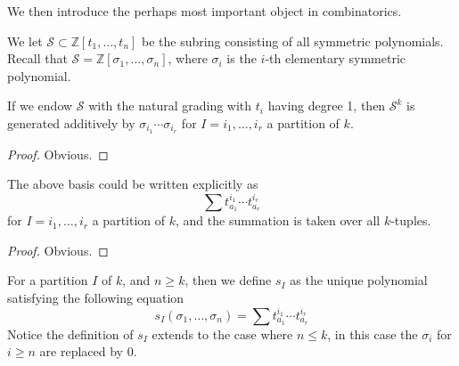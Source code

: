 	We then introduce the perhaps most important object in combinatorics. 
	\begin{defn}
		We let $\mathcal{S}\subset\mathbb{Z}[t_1,\dots,t_n]$ be the subring consisting of all symmetric polynomials. Recall that $\mathcal{S}=\mathbb{Z}[\sigma_1,\dots,\sigma_n]$, where $\sigma_i$ is the $i$-th elementary symmetric polynomial. 
	\end{defn}
	\begin{lemma}
		If we endow $\mathcal{S}$ with the natural grading with $t_i$ having degree 1, then $\mathcal{S}^k$ is generated additively by $\sigma_{i_1}\cdots\sigma_{i_r}$ for $I=i_1,\dots,i_r$ a partition of $k$. 
	\end{lemma}
	\begin{proof}
		Obvious. 
	\end{proof}
	\begin{lemma}
		The above basis could be written explicitly as 
		\[ \sum t_{a_1}^{i_1}\cdots t_{a_r}^{i_r} \]
		for $I=i_1,\dots,i_r$ a partition of $k$, and the summation is taken over all $k$-tuples. 
	\end{lemma}
	\begin{proof}
		Obvious. 
	\end{proof}
	\begin{defn}
		For a partition $I$ of $k$, and $n\ge k$, then we define $s_I$ as the unique polynomial satisfying the following equation
		\[ s_I(\sigma_1,\dots,\sigma_n)=\sum t_{a_1}^{i_1}\cdots t_{a_r}^{i_r} \]
		Notice the definition of $s_I$ extends to the case where $n\le k$, in this case the $\sigma_i$ for $i\ge n$ are replaced by $0$. 
	\end{defn}

